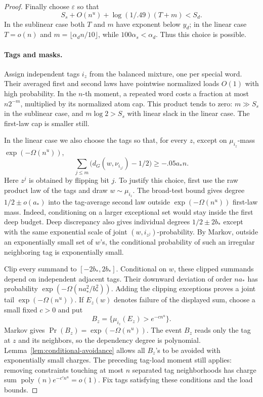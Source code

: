 \begin{proof}
Finally choose \(\varepsilon\) so that
\[
 S_s+O(n^u)+\log(1/.49)(T+m)<S_d.
\]
In the sublinear case both \(T\) and \(m\) have exponent below \(y_d\); in the linear case \(T=o(n)\) and \(m=\lfloor\alpha_dn/10\rfloor\), while \(100\alpha_s<\alpha_d\). Thus this choice is possible.

\paragraph{Tags and masks.}
Assign independent tags \(i_z\) from the balanced mixture, one per special word. Their averaged first and second laws have pointwise normalized loads \(O(1)\) with high probability. In the \(n\)-th moment, a repeated word costs a fraction at most \(n2^{-m}\), multiplied by its normalized atom cap. This product tends to zero: \(m\gg S_s\) in the sublinear case, and \(m\log2> S_s\) with linear slack in the linear case. The first-law cap is smaller still.

In the linear case we also choose the tags so that, for every \(z\), except on \(\mu_{i_z}\)-mass \(\exp(-\Omega(n^u))\),
\[
 \sum_{j\le m}\bigl(d_G(w,\nu_{i_{z^j}})-1/2\bigr)
       \ge -.05a_*n .
\]
Here \(z^j\) is obtained by flipping bit \(j\). To justify this choice, first use the raw product law of the tags and draw \(w\sim\mu_{i_z}\). The broad-test bound gives degree \(1/2\pm o(a_*)\) into the tag-average second law outside \(\exp(-\Omega(n^u))\) first-law mass. Indeed, conditioning on a larger exceptional set would stay inside the first deep budget. Deep discrepancy also gives individual degrees \(1/2\pm2b_*\) except with the same exponential scale of joint \((w,i_{z^j})\)-probability. By Markov, outside an exponentially small set of \(w\)'s, the conditional probability of such an irregular neighboring tag is exponentially small.

Clip every summand to \([-2b_*,2b_*]\). Conditional on \(w\), these clipped summands depend on independent adjacent tags. Their downward deviation of order \(na_*\) has probability
\(\exp(-\Omega(na_*^2/b_*^2))\).
Adding the clipping exceptions proves a joint tail \(\exp(-\Omega(n^u))\). If \(E_z(w)\) denotes failure of the displayed sum, choose a small fixed \(c>0\) and put
\[
 B_z=\{\mu_{i_z}(E_z)>e^{-c n^u}\}.
\]
Markov gives \(\Pr(B_z)=\exp(-\Omega(n^u))\). The event \(B_z\) reads only the tag at \(z\) and its neighbors, so the dependency degree is polynomial. Lemma~\ref{lem:conditional-avoidance} allows all \(B_z\)'s to be avoided with exponentially small charges. The preceding tag-load moment still applies: removing constraints touching at most \(n\) separated tag neighborhoods has charge sum \(\operatorname{poly}(n)e^{-c' n^u}=o(1)\). Fix tags satisfying these conditions and the load bounds.


\end{proof}
